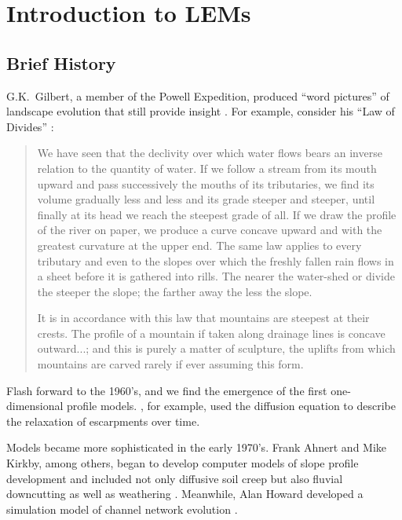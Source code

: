 \documentclass[12pt,reqno]{amsart}
\begin{document}
\section{Introduction to LEMs}

\subsection{Brief History}

G.K.\ Gilbert, a member of the Powell Expedition, produced
``word pictures'' of landscape evolution that still provide insight
\citep{gilbert1877report}. For example, consider his ``Law of Divides'' \citep{gilbert1877report}:

\begin{quote}
\small
We have seen that the declivity over which water flows bears an
inverse relation to the quantity of water. If we follow a stream from
its mouth upward and pass successively the mouths of its tributaries,
we find its volume gradually less and less and its grade steeper and
steeper, until finally at its head we reach the steepest grade of
all. If we draw the profile of the river on paper, we produce a curve
concave upward and with the greatest curvature at the upper end. The
same law applies to every tributary and even to the slopes over which
the freshly fallen rain flows in a sheet before it is gathered into
rills. The nearer the water-shed or divide the steeper the slope; the
farther away the less the slope.

It is in accordance with this law that mountains are steepest at their
crests. The profile of a mountain if taken along drainage lines is
concave outward...; and this is purely a
matter of sculpture, the uplifts from which mountains are carved
rarely if ever assuming this form. 
\end{quote}

Flash forward to the 1960's, and we find the emergence of the first one-dimensional
profile models. \citet{culling1963soil}, for example, used the diffusion equation to
describe the relaxation of escarpments over time. 

Models became more sophisticated in the early 1970's.
Frank Ahnert and Mike Kirkby, among others, began to develop computer models of
slope profile development and included not only diffusive soil creep but also
fluvial downcutting as well as weathering
\citep{ahnert1971general,kirkby1971hillslope}. Meanwhile, Alan Howard
developed a simulation model of channel network evolution
\citep{howard1971simulation}.
\end{document}
